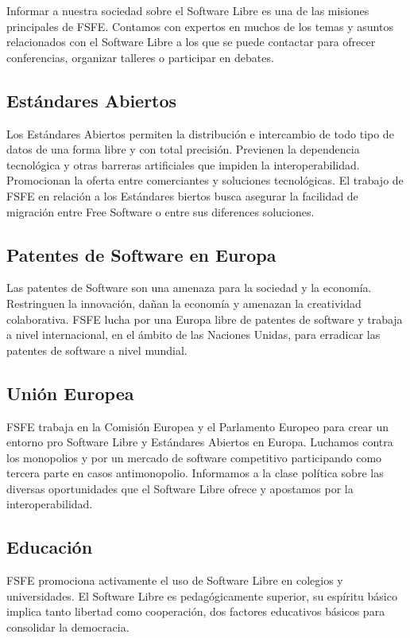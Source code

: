 \documentclass[10pt,foldmark,tumble]{leaflet}
\begin{document}
    Informar a nuestra sociedad sobre el Software Libre es una de las misiones principales de FSFE. Contamos con expertos en muchos de los temas y asuntos relacionados con el Software Libre a los que se puede contactar para ofrecer conferencias, organizar talleres o participar en debates.
    
\subsection{Estándares Abiertos}

    Los Estándares Abiertos permiten la distribución e intercambio de todo tipo de datos de una forma libre y con total precisión. Previenen la dependencia tecnológica y otras barreras artificiales que impiden la interoperabilidad. Promocionan la oferta entre comerciantes y soluciones tecnológicas. El trabajo de FSFE en relación a los Estándares biertos busca asegurar la facilidad de migración entre Free Software o entre sus diferences soluciones.
    
\subsection{Patentes de Software en Europa}

    Las patentes de Software son una amenaza para la sociedad y la economía. Restringuen la innovación, dañan la economía y amenazan la creatividad colaborativa. FSFE lucha por una Europa libre de patentes de software y trabaja a nivel internacional, en el ámbito de las Naciones Unidas, para erradicar las patentes de software a nivel mundial.

\subsection{Unión Europea}

    FSFE trabaja en la Comisión Europea y el Parlamento Europeo para crear un entorno pro Software Libre y Estándares Abiertos en Europa. Luchamos contra los monopolios y por un mercado de software competitivo participando como tercera parte en casos antimonopolio. Informamos a la clase política sobre las diversas oportunidades que el Software Libre ofrece y apostamos por la interoperabilidad.

\subsection{Educación}

    FSFE promociona activamente el uso de Software Libre en colegios y universidades. El Software Libre es pedagógicamente superior, su espíritu básico implica tanto libertad como cooperación, dos factores educativos básicos para consolidar la democracia.
    
\end{document}

